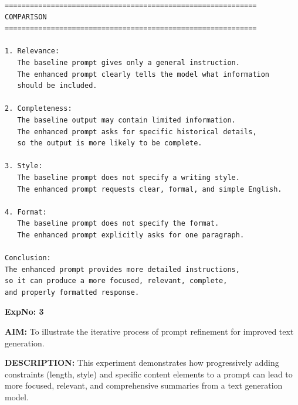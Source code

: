 \documentclass[10pt,a4paper]{article}
\begin{document}
\begin{lstlisting}[style=output]
============================================================
COMPARISON
============================================================

1. Relevance:
   The baseline prompt gives only a general instruction.
   The enhanced prompt clearly tells the model what information
   should be included.

2. Completeness:
   The baseline output may contain limited information.
   The enhanced prompt asks for specific historical details,
   so the output is more likely to be complete.

3. Style:
   The baseline prompt does not specify a writing style.
   The enhanced prompt requests clear, formal, and simple English.

4. Format:
   The baseline prompt does not specify the format.
   The enhanced prompt explicitly asks for one paragraph.

Conclusion:
The enhanced prompt provides more detailed instructions,
so it can produce a more focused, relevant, complete,
and properly formatted response.
\end{lstlisting}


\clearpage

\noindent\textbf{ExpNo: 3}

\noindent\textbf{AIM:} To illustrate the iterative process of prompt refinement for improved text generation.

\noindent\textbf{DESCRIPTION:} This experiment demonstrates how progressively adding constraints (length, style) and specific content elements to a prompt can lead to more focused, relevant, and comprehensive summaries from a text generation model.
\end{document}
